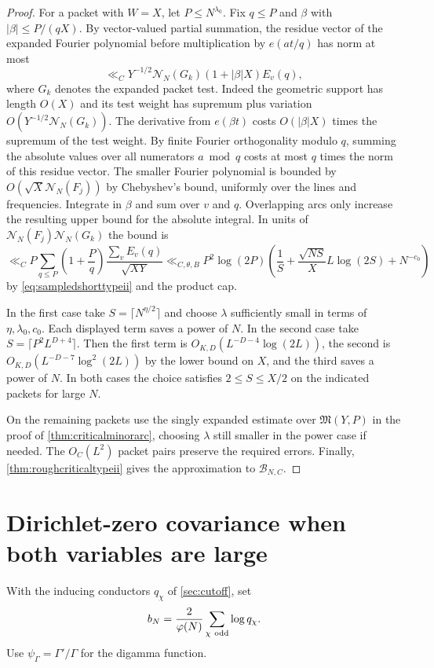 \documentclass[11pt,a4paper]{article}
\numberwithin{equation}{section}
\newcommand{\NN}{\mathcal N_N}
\begin{document}
\begin{proof}
For a packet with $W=X$, let $P\le N^{\lambda_0}$.
Fix $q\le P$ and $\beta$ with $|\beta|\le P/(qX)$.
By vector-valued partial summation, the residue vector
of the expanded Fourier polynomial before multiplication
by $e(at/q)$ has norm at most
\[
 \ll_C Y^{-1/2}\NN(G_k)(1+|\beta|X)E_v(q),
\]
where $G_k$ denotes the expanded packet test. Indeed
the geometric support has length $O(X)$ and its test
weight has supremum plus variation $O(Y^{-1/2}\NN(G_k))$.
The derivative from $e(\beta t)$ costs $O(|\beta|X)$
times the supremum of the test weight. By finite
Fourier orthogonality modulo $q$, summing the absolute
values over all numerators $a\bmod q$ costs at most
$q$ times the norm of this residue vector. The
smaller Fourier polynomial is bounded by
$O(\sqrt X\NN(F_j))$ by Chebyshev's bound, uniformly
over the lines and frequencies. Integrate in $\beta$
and sum over $v$ and $q$. Overlapping arcs only
increase the resulting upper bound for the absolute
integral. In units of $\NN(F_j)\NN(G_k)$ the bound is
\[
 \ll_C P\sum_{q\le P}\left(1+\frac{P}{q}\right)
      \frac{\sum_v E_v(q)}{\sqrt{XY}}
 \ll_{C,\theta,B}
  P^2\log(2P)\left(\frac1S+
          \frac{\sqrt{NS}}{X}L\log(2S)+N^{-c_0}\right)
\]
by \cref{eq:sampledshorttypeii} and the product cap.

In the first case take $S=\lceil N^{\eta/2}\rceil$
and choose $\lambda$ sufficiently small in terms of
$\eta,\lambda_0,c_0$. Each displayed term saves a
power of $N$. In the second case take
$S=\lceil P^2 L^{D+4}\rceil$. Then the first term is
$O_{K,D}(L^{-D-4}\log(2L))$, the second is
$O_{K,D}(L^{-D-7}\log^2(2L))$ by the lower bound on
$X$, and the third saves a power of $N$. In both cases
the choice satisfies $2\le S\le X/2$ on the indicated
packets for large $N$.

On the remaining packets use the singly expanded
estimate over $\mathfrak M(Y,P)$ in the proof of
\cref{thm:criticalminorarc}, choosing $\lambda$ still
smaller in the power case if needed. The $O_C(L^2)$
packet pairs preserve the required errors. Finally,
\cref{thm:roughcriticaltypeii} gives the approximation
to $\mathcal B_{N,C}$.
\end{proof}

\section{Dirichlet-zero covariance when both variables are large}
\label{sec:zeros}

With the inducing conductors $q_\chi$ of \cref{sec:cutoff}, set
\[
 b_N=\frac{2}{\varphi(N)}\sum_{\chi\ {\rm odd}}\log q_\chi.
\]
Use $\psi_\Gamma=\Gamma'/\Gamma$ for the digamma function.
\end{document}
